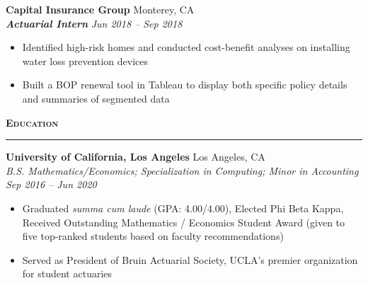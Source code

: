 \documentclass[11pt,letterpaper]{article}
\newcommand{\sectline}{\vspace{5pt}\hrule height 1.5pt\vspace{5pt}}
\newcommand{\sectspace}{\vspace{9pt}}
\newcommand{\smallspace}{\vspace{6pt}}
\newcommand{\heading}[1]{{\fontsize{12pt}{13pt} {\textbf{\textsc{#1}}}}}
\begin{document}
\smallspace 
\textbf{Capital Insurance Group} \hfill Monterey, CA \\
\textbf{\textit{Actuarial Intern}} \hfill \textit{Jun 2018 -- Sep 2018}
\begin{itemize}
	\item Identified high-risk homes and conducted cost-benefit analyses on installing water loss prevention devices
	\item Built a BOP renewal tool in Tableau to display both specific policy details and summaries of segmented data	
\end{itemize}
\sectspace

\heading{Education}\sectline
\textbf{University of California, Los Angeles} \hfill Los Angeles, CA \\
\textit{B.S. Mathematics/Economics; Specialization in Computing; Minor in Accounting} \hfill \textit{Sep 2016 -- Jun 2020}
\begin{itemize}
	\item Graduated \textit{summa cum laude} (GPA: 4.00/4.00), Elected Phi Beta Kappa, Received Outstanding Mathematics / Economics Student Award (given to five  top-ranked students based on faculty recommendations)
	\item Served as President of Bruin Actuarial Society, UCLA's premier organization for student actuaries 
\end{itemize}
\sectspace
\end{document}
